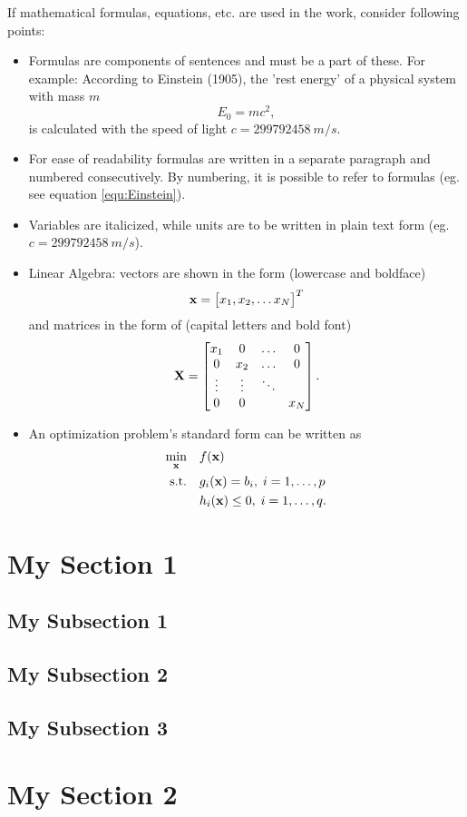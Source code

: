 \documentclass{eegreport}
\begin{document}
If mathematical formulas, equations, etc. are used in the work, consider following points:
\begin{itemize}
	\item Formulas are components of sentences and must be a part of these. For example: According to Einstein (1905), the 'rest energy' of a physical system with mass $ m $ 
	\begin{equation}\label{equ:Einstein}
	E_0 = m c^2,
	\end{equation}
	is calculated with the speed of light $ c = \SI{299792458}{m/s} $.
	\item For ease of readability formulas are written in a separate paragraph and numbered consecutively. By numbering, it is possible to refer to formulas (eg. see equation \ref{equ:Einstein}).
	\item Variables are italicized, while units are to be written in plain text form (eg. $ c = \SI{299792458}{m/s} $).
	\item Linear Algebra: vectors are shown in the form (lowercase and boldface)
		\begin{equation}
			\mathbf{x} = \begin{bmatrix} x_1, x_2, \ldots x_N \end{bmatrix}^T
		\end{equation}
		and matrices in the form of (capital letters and bold font)
		\begin{equation}
			\mathbf{X} = \begin{bmatrix} x_1    & 0      & \dots & 0 \\
									    0    & x_2    & \dots & 0 \\ 
									  \vdots & \vdots & \ddots&   \\      
									    0    & 0      &       & x_N\end{bmatrix}.
		\end{equation}
	\item An optimization problem's standard form can be written as
		\begin{subequations}
		\begin{align}
		\underset{\mathbf{x}}{\text{min}} & \quad f(\mathbf{x}) \\
		\text{s.t.} & \quad g_i(\mathbf{x}) = b_i, \; i = 1, \ldots, p\\
					    & \quad h_i(\mathbf{x}) \leq 0, \; i = 1, \ldots, q.
		\end{align}
		\end{subequations}
\end{itemize}


\section{My Section 1}
\subsection{My Subsection 1}

\subsection{My Subsection 2}

\subsection{My Subsection 3}

\section{My Section 2}
\end{document}
